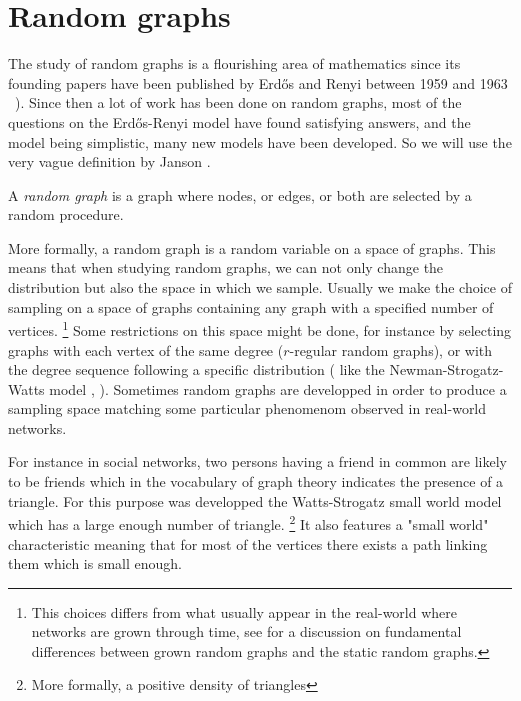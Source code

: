 \section{Random graphs}
The study of random graphs is a flourishing area of mathematics since its founding papers have been published by Erd\H{o}s and Renyi between 1959 and 1963 \cite{erdos59} \cite{erdos60} \cite{erdosconnect61} \cite{erdosevol61} \cite{erdos63}).
Since then a lot of work has been done on random graphs, most of the questions on the Erd\H{o}s-Renyi model have found satisfying answers, and the model being simplistic, many new models have been developed.
So we will use the very vague definition by Janson \cite{Janson14}.
\begin{definition}
	A \emph{random graph} is a graph where nodes, or edges, or both are selected by a random procedure.
\end{definition}
More formally, a random graph is a random variable on a space of graphs.
This means that when studying random graphs, we can not only change the distribution but also the space in which we sample.
\newline
Usually we make the choice of sampling on a space of graphs containing any graph with a specified number of vertices.
\footnote{This choices differs from what usually appear in the real-world where networks are grown through time, see \cite{CHKNS01} for a discussion on fundamental differences between grown random graphs and the static random graphs.}
Some restrictions on this space might be done, for instance by selecting graphs with each vertex of the same degree ($r$-regular random graphs), or with the degree sequence following a specific distribution ( like the Newman-Strogatz-Watts model \cite{Newman01}, \cite{Newman02} ).
Sometimes random graphs are developped in order to produce a sampling space matching  some particular phenomenom observed in real-world networks.

For instance in social networks, two persons having a friend in common are likely to be friends which in the vocabulary of graph theory indicates the presence of a triangle.
For this purpose was developped the Watts-Strogatz small world model \cite{WattsStrogatz98} which has a large enough number of triangle. 
\footnote{More formally, a positive density of triangles}
It also features a "small world" characteristic meaning that for most of the vertices there exists a path linking them which is small enough.
\newline

